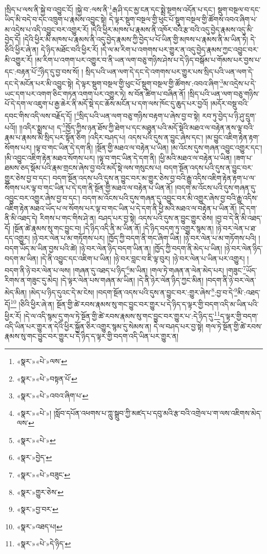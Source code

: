།སྲིད་པ་ལས་ནི་སྐྱེ་བ་འབྱུང་ངོ། །སྐྱེ་བ་:ལས་ནི་\footnote{«སྣར་»«པེ་»ལས་}རྒ་ཤི་དང་མྱ་ངན་དང་སྨྲེ་སྔགས་འདོན་པ་དང་། སྡུག་བསྔལ་བ་དང་ཡིད་མི་བདེ་བ་དང་འཁྲུག་པ་རྣམས་འབྱུང་སྟེ། དེ་ལྟར་སྡུག་བསྔལ་གྱི་ཕུང་པོ་སྡུག་བསྔལ་གྱི་ཚོགས་འབའ་ཞིག་པ་མ་འདྲེས་པ་འདི་འབྱུང་བར་འགྱུར་རོ། །དེའི་ཕྱིར་མཁས་པ་རྣམས་ནི་འཁོར་བའི་རྩ་བའི་འདུ་བྱེད་རྣམས་འདུ་མི་བྱེད་དོ། །དེའི་ཕྱིར་མི་མཁས་པ་རྣམས་ནི་འདུ་བྱེད་རྣམས་ཀྱི་བྱེད་པ་པོ་ཡིན་གྱི་མཁས་པ་རྣམས་ནི་མ་ཡིན་ཏེ། དེ་ཅིའི་ཕྱིར་ཞེ་ན། དེ་ཉིད་མཐོང་བའི་ཕྱིར་རོ། །དེ་ལ་མ་རིག་པ་འགགས་པར་གྱུར་ན་འདུ་བྱེད་རྣམས་ཀྱང་འབྱུང་བར་མི་འགྱུར་རོ། །མ་རིག་པ་འགག་པར་འགྱུར་བ་ནི་ཡན་ལག་བཅུ་གཉིས་ཤེས་པ་དེ་ཉིད་བསྒོམ་པ་གོམས་པར་བྱས་པ་དང་:བརྟན་པོ་\footnote{«སྣར་»«པེ་»བསྟན་པོ་}ཉིད་དུ་བྱ་བས་སོ། །
སྲིད་པའི་ཡན་ལག་དེ་དང་དེ་འགགས་པར་གྱུར་པས་སྲིད་པའི་ཡན་ལག་དེ་དང་དེ་མངོན་པར་མི་འབྱུང་སྟེ། དེ་ལྟར་སྡུག་བསྔལ་གྱི་ཕུང་པོ་སྡུག་བསྔལ་གྱི་ཚོགས་:འབའ་ཞིག་\footnote{«སྣར་»«པེ་»འབའ་ཞིག་པ་}མ་འདྲེས་པ་དེ་ཡང་དག་པར་འགག་ཅིང་གཏན་འགག་པར་འགྱུར་ཏེ། ས་བོན་ཚིག་པ་བཞིན་ནོ། །སྲིད་པའི་ཡན་ལག་བཅུ་གཉིས་པོ་དེ་དག་ལ་འཇུག་པ་རྒྱ་ཆེར་ནི་མདོ་སྡེ་དང་ཆོས་མངོན་པ་དག་ལས་ཁོང་དུ་ཆུད་པར་བྱའོ། །མདོར་བསྡུ་བའི་དབང་གིས་འདི་ལས་བརྗོད་དོ། །\footnote{«སྣར་»«པེ་»། །སློབ་དཔོན་འཕགས་པ་ཀླུ་སྒྲུབ་ཀྱི་མཛད་པ་དབུ་མའི་རྩ་བའི་འགྲེལ་པ་ག་ལས་འཇིགས་མེད་ལས་}སྲིད་པའི་ཡན་ལག་བཅུ་གཉིས་བརྟག་པ་ཞེས་བྱ་བ་སྟེ། རབ་ཏུ་བྱེད་པ་ཉི་ཤུ་དྲུག་པའོ།། །།འདིར་སྨྲས་པ། ད་\footnote{«སྣར་»«པེ་»}ཁྱོད་ཀྱིས་ཉན་ཐོས་ཀྱི་ཐེག་པ་དང་མཐུན་པའི་མདོ་སྡེའི་མཐའ་ལ་བརྟེན་ནས་ལྟ་བའི་རྣམ་པ་རྣམས་མི་སྲིད་པར་སྟོན་ཅིག །འདིར་བཤད་པ། འདས་པའི་དུས་ན་བྱུང་ཞེས་དང་། །མ་བྱུང་འཇིག་རྟེན་རྟག་སོགས་པར། །ལྟ་བ་གང་ཡིན་དེ་དག་ནི། །སྔོན་གྱི་མཐའ་ལ་བརྟེན་པ་ཡིན། །མ་འོངས་དུས་གཞན་འབྱུང་འགྱུར་དང་། །མི་འབྱུང་འཇིག་རྟེན་མཐའ་སོགས་པར། །ལྟ་བ་གང་ཡིན་དེ་དག་ནི། །ཕྱི་མའི་མཐའ་ལ་བརྟེན་པ་ཡིན། །ཟག་པ་ཐམས་ཅད་སྡོམ་པའི་རྣམ་གྲངས་ཞེས་བྱ་བའི་མདོ་སྡེ་ལས་གསུངས་པ། བདག་སྔོན་འདས་པའི་དུས་ན་བྱུང་བར་གྱུར་ཅེས་བྱ་བ་དང་། བདག་སྔོན་འདས་པའི་དུས་ན་བྱུང་བར་མ་གྱུར་ཅེས་བྱ་བའི་རྒྱུ་འདིས་འཇིག་རྟེན་རྟག་པ་ལ་སོགས་པར་ལྟ་བ་གང་ཡིན་པ་དེ་དག་ནི་སྔོན་གྱི་མཐའ་ལ་བརྟེན་པ་ཡིན་ནོ། །བདག་མ་འོངས་པའི་དུས་གཞན་དུ་འབྱུང་བར་འགྱུར་ཞེས་བྱ་བ་དང་། བདག་མ་འོངས་པའི་དུས་གཞན་དུ་འབྱུང་བར་མི་འགྱུར་ཞེས་བྱ་བའི་རྒྱུ་འདིས་འཇིག་རྟེན་མཐའ་ཡོད་པ་ལ་སོགས་པར་ལྟ་བ་གང་ཡིན་པ་དེ་དག་ནི་ཕྱི་མའི་མཐའ་ལ་བརྟེན་པ་ཡིན་ནོ། །དེ་དག་ནི་མི་འཐད་དེ། རིགས་པ་གང་གིས་ཤེ་ན། བཤད་པར་བྱ་སྟེ། འདས་པའི་དུས་ན་བྱུང་གྱུར་ཅེས། །བྱ་བ་དེ་ནི་མི་འཐད་དོ། །སྔོན་ཚེ་རྣམས་སུ་གང་བྱུང་བ། །དེ་ཉིད་འདི་ནི་མ་ཡིན་ནོ། །དེ་ཉིད་བདག་ཏུ་འགྱུར་སྙམ་ན། །ཉེ་བར་ལེན་པ་ཐ་དད་འགྱུར། །ཉེ་བར་ལེན་པ་མ་གཏོགས་པར། །ཁྱོད་ཀྱི་བདག་ནི་གང་ཞིག་ཡིན། །ཉེ་བར་ལེན་པ་མ་གཏོགས་པའི། །བདག་ཡོད་མ་ཡིན་བྱས་པའི་ཚེ། །ཉེ་བར་ལེན་ཉིད་བདག་ཡིན་ན། །ཁྱོད་ཀྱི་བདག་ནི་མེད་པ་ཡིན། །ཉེ་བར་ལེན་ཉིད་བདག་མ་ཡིན། །དེ་ནི་འབྱུང་དང་འཇིག་པ་ཡིན། །ཉེ་བར་བླང་བ་ཇི་ལྟ་བུར། །ཉེ་བར་ལེན་པ་ཡིན་པར་འགྱུར། །བདག་ནི་ཉེ་བར་ལེན་པ་ལས། །གཞན་དུ་འཐད་པ་ཉིད་\footnote{«སྣར་»བྱེད་}མ་ཡིན། །གལ་ཏེ་གཞན་ན་ལེན་མེད་པར། །གཟུང་\footnote{«སྣར་»«པེ་»བཟུང་}ཡོད་རིགས་ན་གཟུང་དུ་མེད། །དེ་ལྟར་ལེན་པས་གཞན་མ་ཡིན། །དེ་ནི་ཉེར་ལེན་ཉིད་ཀྱང་མིན། །བདག་ནི་ཉེ་བར་ལེན་མེད་མིན། །མེད་པ་ཉིད་དུའང་དེ་མ་ངེས། །བདག་སྔོན་འདས་པའི་དུས་ན་བྱུང་བར་:གྱུར་ཞེས་\footnote{«སྣར་»གྱུར་ཅེས་}:བྱ་བ་དེ་\footnote{«སྣར་»བྱ་བར་}མི་:འཐད་དོ།\footnote{«སྣར་»འཐད་པ།} །ཅིའི་ཕྱིར་ཞེ་ན། སྔོན་གྱི་ཚེ་རབས་རྣམས་སུ་གང་བྱུང་བར་གྱུར་པ་དེ་ཉིད་ད་ལྟར་གྱི་བདག་འདི་མ་ཡིན་པའི་ཕྱིར་རོ། །དེ་ལ་འདི་སྙམ་དུ་གལ་ཏེ་སྔོན་གྱི་ཚེ་རབས་རྣམས་སུ་གང་བྱུང་བར་གྱུར་པ་:དེ་ཉིད་དུ་\footnote{«སྣར་»«པེ་»དེ་ཉིད་}ད་ལྟར་གྱི་བདག་འདི་ཡིན་པར་གྱུར་ན་དེའི་ཕྱིར་སྐྱོན་ཅིར་འགྱུར་སྙམ་དུ་སེམས་ན། དེ་ལ་བཤད་པར་བྱ་སྟེ། གལ་ཏེ་སྔོན་གྱི་ཚེ་རབས་རྣམས་སུ་གང་བྱུང་བར་གྱུར་པ་དེ་ཉིད་ད་ལྟར་གྱི་བདག་འདི་ཡིན་པར་གྱུར་ན། 